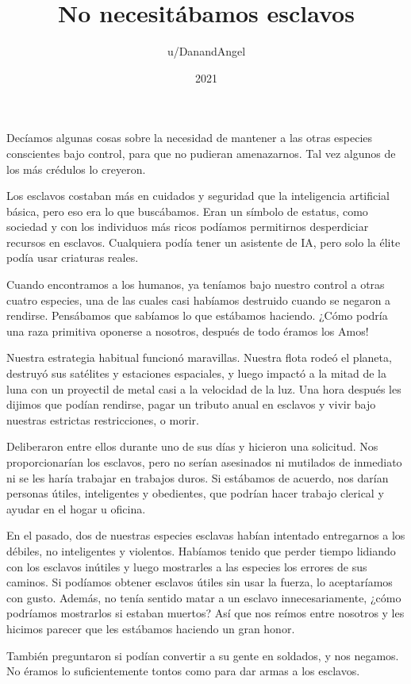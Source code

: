 \documentclass[spanish,12pt,a4paper,oneside,titlepage]{book}
\title{No necesitábamos esclavos}
\author{u/DanandAngel}
\date{2021}
\begin{document}
    \maketitle

    Decíamos algunas cosas sobre la necesidad de mantener a las otras especies conscientes bajo control, para que no pudieran amenazarnos. Tal vez algunos de los más crédulos lo creyeron.

    Los esclavos costaban más en cuidados y seguridad que la inteligencia artificial básica, pero eso era lo que buscábamos. Eran un símbolo de estatus, como sociedad y con los individuos más ricos podíamos permitirnos desperdiciar recursos en esclavos. Cualquiera podía tener un asistente de IA, pero solo la élite podía usar criaturas reales.

    Cuando encontramos a los humanos, ya teníamos bajo nuestro control a otras cuatro especies, una de las cuales casi habíamos destruido cuando se negaron a rendirse. Pensábamos que sabíamos lo que estábamos haciendo. ¿Cómo podría una raza primitiva oponerse a nosotros, después de todo éramos los Amos!

    Nuestra estrategia habitual funcionó maravillas. Nuestra flota rodeó el planeta, destruyó sus satélites y estaciones espaciales, y luego impactó a la mitad de la luna con un proyectil de metal casi a la velocidad de la luz. Una hora después les dijimos que podían rendirse, pagar un tributo anual en esclavos y vivir bajo nuestras estrictas restricciones, o morir.

    Deliberaron entre ellos durante uno de sus días y hicieron una solicitud. Nos proporcionarían los esclavos, pero no serían asesinados ni mutilados de inmediato ni se les haría trabajar en trabajos duros. Si estábamos de acuerdo, nos darían personas útiles, inteligentes y obedientes, que podrían hacer trabajo clerical y ayudar en el hogar u oficina.

    En el pasado, dos de nuestras especies esclavas habían intentado entregarnos a los débiles, no inteligentes y violentos. Habíamos tenido que perder tiempo lidiando con los esclavos inútiles y luego mostrarles a las especies los errores de sus caminos. Si podíamos obtener esclavos útiles sin usar la fuerza, lo aceptaríamos con gusto. Además, no tenía sentido matar a un esclavo innecesariamente, ¿cómo podríamos mostrarlos si estaban muertos? Así que nos reímos entre nosotros y les hicimos parecer que les estábamos haciendo un gran honor.

    También preguntaron si podían convertir a su gente en soldados, y nos negamos. No éramos lo suficientemente tontos como para dar armas a los esclavos.
\end{document}
